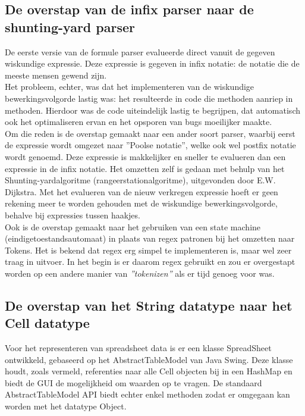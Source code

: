 \documentclass[a4paper,11pt,titlepage]{scrartcl}
\begin{document}
\subsection{De overstap van de infix parser naar de shunting-yard parser}
De eerste versie van de formule parser evalueerde direct vanuit de gegeven wiskundige expressie. Deze expressie is gegeven in infix notatie: de notatie die de meeste mensen gewend zijn.\\

Het probleem, echter, was dat het implementeren van de wiskundige bewerkingsvolgorde lastig was: het resulteerde in code die methoden aanriep in methoden. Hierdoor was de code uiteindelijk lastig te begrijpen, dat automatisch ook het optimaliseren ervan en het opsporen van bugs moeilijker maakte.\\ Om die reden is de overstap gemaakt naar een ander soort parser, waarbij eerst de expressie wordt omgezet naar ''Poolse notatie'', welke ook wel postfix notatie wordt genoemd. Deze expressie is makkelijker en sneller te evalueren dan een expressie in de infix notatie. Het omzetten zelf is gedaan met behulp van het Shunting-yardalgoritme (rangeerstationalgoritme), uitgevonden door E.W. Dijkstra. Met het evalueren van de nieuw verkregen expressie hoeft er geen rekening meer te worden gehouden met de wiskundige bewerkingsvolgorde, behalve bij expressies tussen haakjes.\\

Ook is de overstap gemaakt naar het gebruiken van een state machine (eindigetoestandsautomaat) in plaats van regex patronen bij het omzetten naar Tokens. Het is bekend dat regex erg simpel te implementeren is, maar wel zeer traag in uitvoer. In het begin is er daarom regex gebruikt en zou er overgestapt worden op een andere manier van \textit{''tokenizen''} als er tijd genoeg voor was.

\newpage\subsection{De overstap van het String datatype naar het Cell datatype}
Voor het representeren van spreadsheet data is er een klasse SpreadSheet ontwikkeld, gebaseerd op het AbstractTableModel van Java Swing. Deze klasse houdt, zoals vermeld, referenties naar alle Cell objecten bij in een HashMap en biedt de GUI de mogelijkheid om waarden op te vragen. De standaard AbstractTableModel API biedt echter enkel methoden zodat er omgegaan kan worden met het datatype Object.\\
\end{document}

